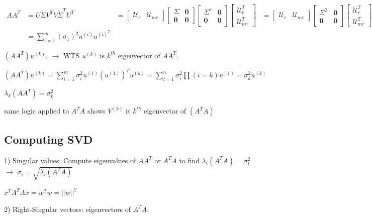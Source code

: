 \begin{align*}
AA^T &= U\tilde{\Sigma} V^TV\tilde{\Sigma}^TU^T
&=
\begin{bmatrix}
\mathcal{U}_r & \mathcal{U}_{mr}
\end{bmatrix}
\begin{bmatrix}
\Sigma & \textbf{0}\\
\textbf{0}&\textbf{0}
\end{bmatrix}
\begin{bmatrix}
\Sigma^r & \textbf{0}\\
\textbf{0}&\textbf{0}
\end{bmatrix}
\begin{bmatrix}
\mathcal{U}_r^T\\
\mathcal{U}_{mr}^T
\end{bmatrix}
&=
\begin{bmatrix}
\mathcal{U}_r & \mathcal{U}_{mr}
\end{bmatrix}
\begin{bmatrix}
\Sigma^2 & \textbf{0}\\
\textbf{0}&\textbf{0}
\end{bmatrix}
\begin{bmatrix}
\mathcal{U}_r^T\\
\mathcal{U}_{mr}^T
\end{bmatrix}
&= \sum^r_{i=1}(\sigma_i)^2u^{(i)}(u&{(i)})^T\\
&= \sum^m_{i=1}(\sigma_1)^2u^{(i)}u^{(i)^T}
\end{align*}



$(AA^T)u^{(k)}$, $\rightarrow$ WTS $u^{(k)}$ is $k^{th}$ eigenvector of $AA^T$. 

$(AA^T)u^{(k)} = \sum^m_{i=1}\sigma_i^2u^{(1)}(u^{(1)})^Tu^{(k)} = \sum^n_{i=1}\sigma_i^2\prod(i=k)u^{(1)} =\sigma^2_ku^{(k)}$

$\lambda_k(AA^T) = \sigma^2_k$

same logic applied to $A^TA$ shows $V^{(k)}$ is $k^{th}$ eigenvector of $(A^TA)$


\subsection{Computing SVD}

1) Singular values: Compute eigenvalues of $AA^T$ or $A^TA$ to find $\lambda_i(A^TA) =\sigma_i^2$ $\rightarrow$ $\sigma_i = \sqrt{\lambda_i(A^TA)}$

$x^TA^TAx = w^Tw =||w||^2$

2) Right-Singular vectors: eigenvectors of $A^TA$;

